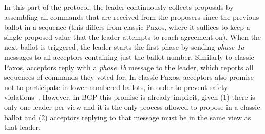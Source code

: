In this part of the protocol, the leader continuously collects proposals by assembling all commands that are received from the proposers since the previous ballot in a sequence (this differs from classic Paxos, where it suffices to keep a single proposed value that the leader attempts to reach agreement on). When the next ballot is triggered, the leader starts the first phase by sending \textit{phase 1a} messages to all acceptors containing just the ballot number. Similarly to classic Paxos, acceptors reply with a \textit{phase 1b} message to the leader, which reports all sequences of commands they voted for. In classic Paxos, acceptors also promise not to participate in lower-numbered ballots, in order to prevent safety violations~\cite{Lam98}. However, in BGP this promise is already implicit, given (1) there is only one leader per view and it is the only process allowed to propose in a classic ballot and (2) acceptors replying to that message must be in the same view as that leader.

